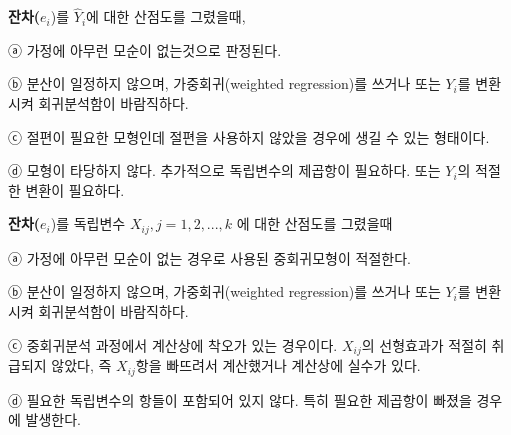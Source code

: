 \documentclass[
]{article}
\begin{document}
\textbf{잔차(}\(e_i\))를 \(\hat{Y}_i\)에 대한 산점도를 그렸을때,

ⓐ 가정에 아무런 모순이 없는것으로 판정된다.

ⓑ 분산이 일정하지 않으며, 가중회귀(weighted regression)를 쓰거나 또는
\(Y_i\)를 변환시켜 회귀분석함이 바람직하다.

ⓒ 절편이 필요한 모형인데 절편을 사용하지 않았을 경우에 생길 수 있는
형태이다.

ⓓ 모형이 타당하지 않다. 추가적으로 독립변수의 제곱항이 필요하다. 또는
\(Y_i\)의 적절한 변환이 필요하다.

\textbf{잔차(}\(e_i\))를 독립변수 \(X_{ij}, j= 1,2,...,k\) 에 대한
산점도를 그렸을때

ⓐ 가정에 아무런 모순이 없는 경우로 사용된 중회귀모형이 적절한다.

ⓑ 분산이 일정하지 않으며, 가중회귀(weighted regression)를 쓰거나 또는
\(Y_i\)를 변환시켜 회귀분석함이 바람직하다.

ⓒ 중회귀분석 과정에서 계산상에 착오가 있는 경우이다. \(X_{ij}\)의
선형효과가 적절히 취급되지 않았다, 즉 \(X_{ij}\)항을 빠뜨려서 계산했거나
계산상에 실수가 있다.

ⓓ 필요한 독립변수의 항들이 포함되어 있지 않다. 특히 필요한 제곱항이
빠졌을 경우에 발생한다.

\hypertarget{section}{%
\subsubsection{}\label{section}}
\end{document}
